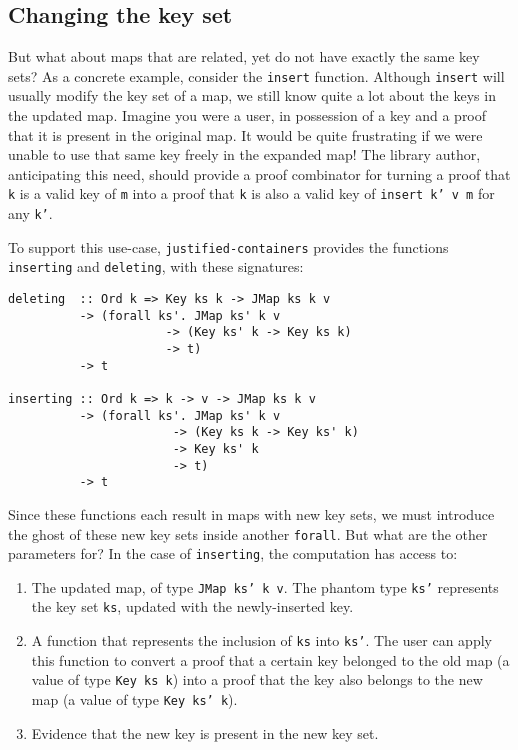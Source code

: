 \documentclass[format=sigplan, review=false, screen=true]{acmart}
\begin{document}
\subsection{Changing the key set}\label{changing-keys}
But what about maps that are related, yet do not have exactly the same key sets?
As a concrete example, consider the \texttt{insert} function. Although \texttt{insert} will usually
modify the key set of a map, we still know quite a lot about the keys in the updated map.
 Imagine you were a user, in possession of a key and a proof
that it is present in the original map. It would be quite frustrating if  we were
unable to use that same key freely in the expanded map!
The library author, anticipating this need, should provide a proof combinator for
turning a proof that \texttt{k} is a valid key of \texttt{m} into a proof that
\texttt{k} is also a valid key of \texttt{insert k' v m} for any \texttt{k'}.

To support this use-case, \texttt{justified-containers} provides the functions
\texttt{inserting} and \texttt{deleting}, with these signatures:
\begin{verbatim}
deleting  :: Ord k => Key ks k -> JMap ks k v
          -> (forall ks'. JMap ks' k v
                      -> (Key ks' k -> Key ks k)
                      -> t)
          -> t

inserting :: Ord k => k -> v -> JMap ks k v
          -> (forall ks'. JMap ks' k v
                       -> (Key ks k -> Key ks' k)
                       -> Key ks' k
                       -> t)
          -> t
\end{verbatim}
Since these functions each result in maps with new key sets, we must
introduce the ghost of these new key sets inside another \texttt{forall}.
But what are the other parameters for? In the case of \texttt{inserting},
the computation has access to:
\begin{enumerate}
\item The updated map, of type \texttt{JMap ks' k v}. The phantom type \texttt{ks'}
  represents the key set \texttt{ks}, updated with the newly-inserted key.
\item A function that represents the inclusion of \texttt{ks} into \texttt{ks'}.
  The user can apply this function to convert a proof that a certain key belonged to the
  old map (a value of type \texttt{Key ks k}) into a proof that the key also belongs to the new map (a value of type \texttt{Key ks' k}).
\item Evidence that the new key is present in the new key set.
\end{enumerate}
\end{document}
